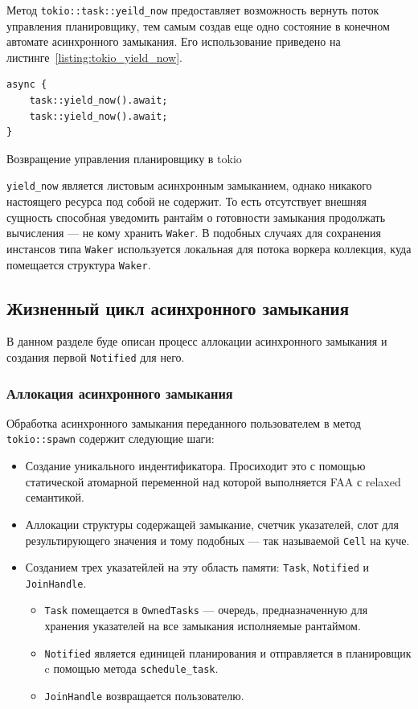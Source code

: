 Метод \verb|tokio::task::yeild_now| предоставляет возможность вернуть поток управления планировщику, тем самым создав еще одно состояние в конечном автомате асинхронного замыкания. Его использование приведено на листинге~\ref{listing:tokio_yield_now}.

\begin{listing}[H]
    \begin{verbatim}
async {
    task::yield_now().await;
    task::yield_now().await;
}
    \end{verbatim}

    \caption{Возвращение управления планировщику в tokio}
    \label{listing:tokio_yield_now}
\end{listing}

\verb|yield_now| является листовым асинхронным замыканием, однако никакого настоящего ресурса под собой не содержит. То есть отсутствует внешняя сущность способная уведомить рантайм о готовности замыкания продолжать вычисления --- не кому хранить \verb|Waker|. В подобных случаях для сохранения инстансов типа \verb|Waker| используется локальная для потока воркера коллекция, куда помещается структура \verb|Waker|.

\subsection{Жизненный цикл асинхронного замыкания}

В данном разделе буде описан процесс аллокации асинхронного замыкания и создания первой \verb|Notified| для него.

\subsubsection{Аллокация асинхронного замыкания}

Обработка асинхронного замыкания переданного пользователем в метод \verb|tokio::spawn| содержит следующие шаги:

\begin{itemize}
    \item Создание уникального индентификатора. Просиходит это с помощью статической атомарной переменной над которой выполняется FAA с relaxed семантикой.
    \item Аллокации структуры содержащей замыкание, счетчик указателей, слот для результирующего значения и тому подобных --- так называемой \verb|Cell| на куче.
    \item Созданием трех указатейлей на эту область памяти: \verb|Task|, \verb|Notified| и \verb|JoinHandle|.
    \begin{itemize}
        \item \verb|Task| помещается в \verb|OwnedTasks| --- очередь, предназначенную для хранения указателей на все замыкания исполняемые рантаймом.
        \item \verb|Notified| является единицей планирования и отправляется в планировщик c помощью метода \verb|schedule_task|.
        \item \verb|JoinHandle| возвращается пользователю.
    \end{itemize}
\end{itemize}

